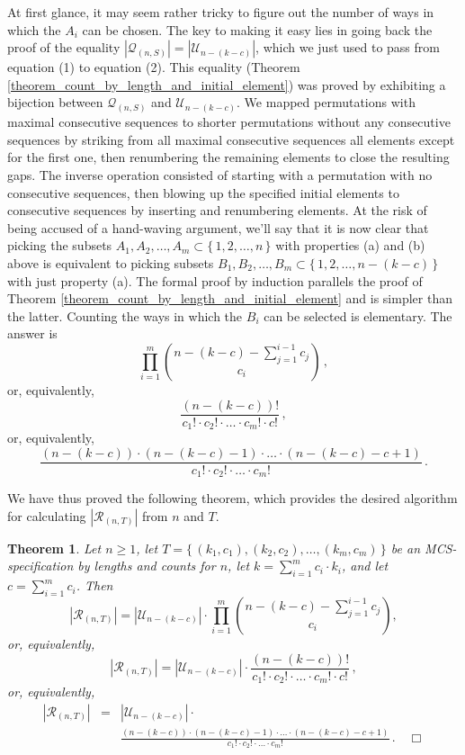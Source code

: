\documentclass{article}
\newtheorem{theorem}{Theorem}[section]
\begin{document}
At first glance, it may seem rather tricky to figure out the number of ways in which the $A_i$ can be chosen.
The key to making it easy lies in going back the proof of the equality
$|{\mathcal Q}_{(n,S)}| = |{\mathcal U}_{n - (k - c)}|$, which we just used to pass from equation (1) to
equation (2). This equality (Theorem \ref{theorem_count_by_length_and_initial_element}) was proved
by exhibiting a bijection between ${\mathcal Q}_{(n,S)}$ and ${\mathcal U}_{n - (k - c)}$.
We mapped permutations with maximal consecutive sequences to shorter permutations without any consecutive
sequences by striking from all maximal consecutive sequences all elements except for the
first one, then renumbering the remaining elements to close the resulting gaps. The inverse operation consisted of
starting with a permutation with no consecutive sequences, then
blowing up the specified initial elements to consecutive sequences by inserting and renumbering elements. At the risk
of being accused of a hand-waving argument, we'll say that it is now clear that picking the subsets
$A_1, A_2, \ldots, A_{m}\subset \{\,1, 2, \ldots, n\,\}$ with properties (a) and (b) above is equivalent to picking
subsets $B_1, B_2, \ldots, B_{m}\subset \{\,1, 2, \ldots, n - (k - c)\,\}$ with just property (a).
The formal proof by induction parallels the proof of Theorem \ref{theorem_count_by_length_and_initial_element} and
is simpler than the latter.
Counting the ways in which the $B_i$ can be selected is elementary. The answer is
$$
\prod_{i=1}^m\binom{n-(k-c) - \sum_{j=1}^{i-1}c_j}{c_i}\,,
$$
or, equivalently,
$$
\frac{(n-(k-c))!}{c_1! \cdot c_2! \cdot \ldots \cdot c_m! \cdot c!}\,,
$$
or, equivalently,
$$
\frac{(n-(k-c)) \cdot (n-(k-c) - 1)\cdot \ldots \cdot (n-(k-c) - c + 1)}{c_1! \cdot c_2! \cdot \ldots \cdot c_m!}\,.
$$

We have thus proved the following theorem, which provides the desired algorithm for calculating
$|{\mathcal R}_{(n,T)}|$ from $n$ and $T$.

\begin{theorem}\label{theorem_count_by_length_and_count}
  Let $n \geq 1$, let $T = \{\,(k_1, c_1), (k_2, c_2), \ldots,(k_m, c_m)\,\}$ be an
  MCS-specification by lengths and counts for $n$, let $k = \sum_{i=1}^m c_i \cdot k_i$,
  and let $c = \sum_{i=1}^m c_i$.
  Then
  $$
  |{\mathcal R}_{(n,T)}| = |{\mathcal U}_{n - (k - c)}| \cdot
  \prod_{i=1}^m\binom{n-(k-c) - \sum_{j=1}^{i-1}c_j}{c_i},
  $$
  or, equivalently,
  $$
  |{\mathcal R}_{(n,T)}| = |{\mathcal U}_{n - (k - c)}| \cdot
  \frac{(n-(k-c))!}{c_1! \cdot c_2! \cdot \ldots \cdot c_m! \cdot c!}\,,
  $$
  or, equivalently,
  \begin{eqnarray*}
    |{\mathcal R}_{(n,T)}| & = & |{\mathcal U}_{n - (k - c)}| \cdot \\
                           &   &
    \frac{(n-(k-c)) \cdot (n-(k-c) - 1)\cdot \ldots \cdot (n-(k-c) - c + 1)}{c_1! \cdot c_2! \cdot \ldots \cdot c_m!}\,.
    \quad \Box
  \end{eqnarray*}
 
\end{theorem}
\end{document}
